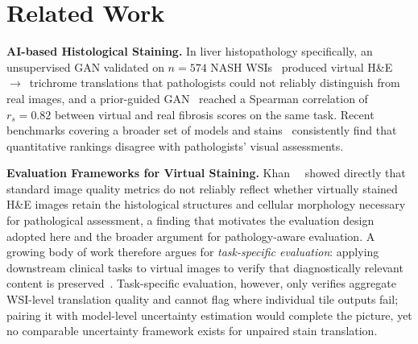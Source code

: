 \section{Related Work}
\label{sec:related_work}

\noindent\textbf{AI-based Histological Staining.}
In liver histopathology specifically, an unsupervised GAN validated on $n{=}574$ NASH
WSIs~\cite{kieffer2020largescale} produced virtual H\&E~$\to$~trichrome translations
that pathologists could not reliably distinguish from real images, and a prior-guided
GAN~\cite{li2023unpaired} reached a Spearman correlation of $r_s{=}0.82$ between virtual
and real fibrosis scores on the same task.
Recent benchmarks covering a broader set of models and stains~\cite{visgab2025,
staindiffuser2024, klockner2025he} consistently find that quantitative rankings disagree
with pathologists' visual assessments.

\noindent\textbf{Evaluation Frameworks for Virtual Staining.}
Khan~\etal~\cite{khan2023effect} showed directly that standard image quality metrics do
not reliably reflect whether virtually stained H\&E images retain the histological structures
and cellular morphology necessary for pathological assessment, a finding that
motivates the evaluation design adopted here and the broader argument for
pathology-aware evaluation.
A growing body of work therefore argues for \textit{task-specific evaluation}: applying
downstream clinical tasks to virtual images to verify that diagnostically relevant
content is preserved~\cite{renal_seg2025, her2task2024}.
Task-specific evaluation, however, only verifies aggregate WSI-level translation quality and
cannot flag where individual tile outputs fail; pairing it with model-level uncertainty
estimation would complete the picture, yet no comparable uncertainty framework exists
for unpaired stain translation.

